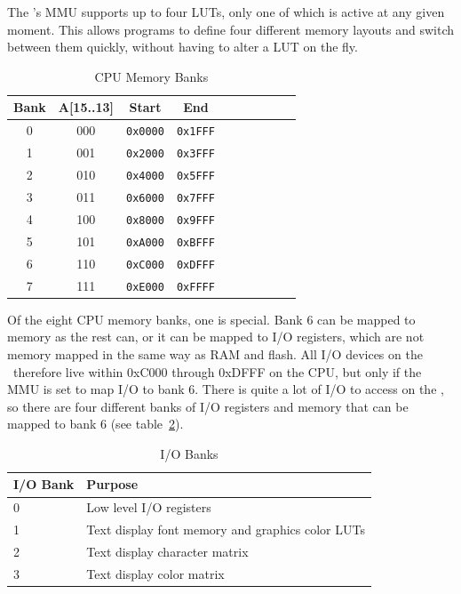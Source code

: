 The \jr's MMU supports up to four LUTs, only one of which is active at any given moment. This allows programs to define four different memory layouts and switch between them quickly, without having to alter a LUT on the fly.

\begin{table}[ht]
	\begin{center}
		\begin{tabular}{| c | c || c | c | c | c | c | c | c | c |} \hline
			Bank & A[15..13] & Start & End \\ \hline\hline
			0 & 000 & \verb+0x0000+ & \verb+0x1FFF+ \\ \hline
			1 & 001 & \verb+0x2000+ & \verb+0x3FFF+ \\ \hline
			2 & 010 & \verb+0x4000+ & \verb+0x5FFF+ \\ \hline
			3 & 011 & \verb+0x6000+ & \verb+0x7FFF+ \\ \hline
			4 & 100 & \verb+0x8000+ & \verb+0x9FFF+ \\ \hline
			5 & 101 & \verb+0xA000+ & \verb+0xBFFF+ \\ \hline
			6 & 110 & \verb+0xC000+ & \verb+0xDFFF+ \\ \hline
			7 & 111 & \verb+0xE000+ & \verb+0xFFFF+ \\ \hline
		\end{tabular}
	\end{center}
	\caption{CPU Memory Banks}
	\label{tab:mem_banks}
\end{table}

Of the eight CPU memory banks, one is special. Bank 6 can be mapped to memory as the rest can, or it can be mapped to I/O registers, which are not memory mapped in the same way as RAM and flash. All I/O devices on the \jr\ therefore live within 0xC000 through 0xDFFF on the CPU, but only if the MMU is set to map I/O to bank 6. There is quite a lot of I/O to access on the \jr, so there are four different banks of I/O registers and memory that can be mapped to bank 6 (see table~\ref{tab:io_banks}).

\begin{table}[ht]
	\begin{center}
		\begin{tabular}{| l | l |} \hline
			I/O Bank & Purpose \\ \hline\hline
			0 & Low level I/O registers \\ \hline
			1 & Text display font memory and graphics color LUTs \\ \hline
			2 & Text display character matrix \\ \hline
			3 & Text display color matrix \\ \hline
		\end{tabular}
	\end{center}
	\caption{I/O Banks}
	\label{tab:io_banks}
\end{table}

